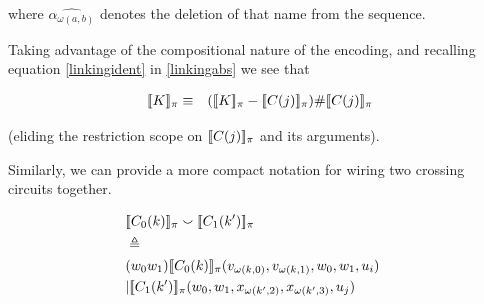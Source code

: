 \documentclass[]{llncs}
\begin{document}
where $\widehat{\alpha_{\omega(a,b)}}$ denotes the deletion of that name from the sequence.

Taking advantage of the compositional nature of the encoding, and
recalling equation \ref{linkingident} in \ref{linkingabs} we see that






\begin{eqnarray}
  \meaningof{K}_{\pi} & \equiv & (\meaningof{K}_{\pi} - \meaningof{C(j)}_{\pi}) \# \meaningof{C(j)}_{\pi}
\end{eqnarray}

(eliding the restriction scope on $[\![ C(j) ]\!]_{\pi}$ and its arguments).

Similarly, we can provide a more compact notation for wiring two crossing circuits together.

\begin{eqnarray}
  & \meaningof{C_0(k)}_{\pi} \smallsmile \meaningof{C_1(k')}_{\pi} & \nonumber \\
  & \triangleq & \nonumber \\
  & ( w_0 w_1)\meaningof{C_0(k)}_{\pi}(v_{\omega(k,0)},v_{\omega(k,1)},w_0,w_1,u_i) & \nonumber \\
  & | \meaningof{C_1(k')}_{\pi}(w_0,w_1,x_{\omega(k',2)},x_{\omega(k',3)},u_j) &
\end{eqnarray}
\end{document}
